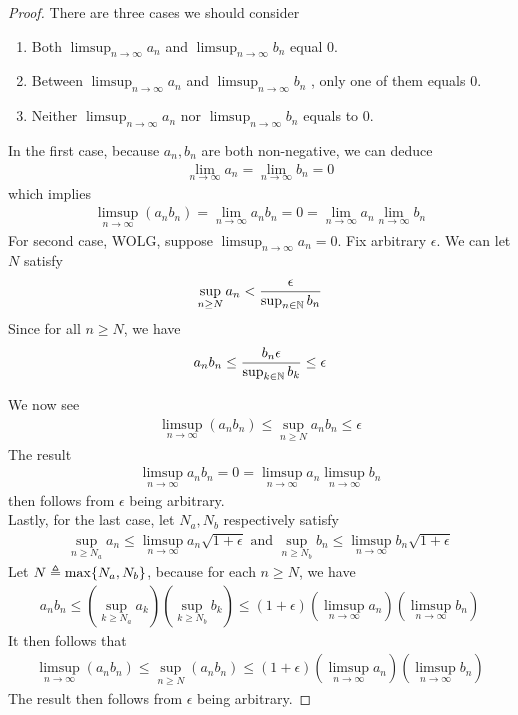 \documentclass{report}
\begin{document}
\begin{proof}
There are three cases we should consider 
\begin{enumerate}[label=(\alph*)]
  \item Both  $\limsup_{n\to\infty} a_n$ and $\limsup_{n\to\infty} b_n$ equal $0$. 
  \item Between $\limsup_{n\to\infty} a_n$ and $\limsup_{n\to\infty} b_n$ , only one of them equals $0$.  
  \item Neither  $\limsup_{n\to\infty} a_n$ nor $\limsup_{n\to\infty} b_n$ equals to $0$. 
\end{enumerate}
In the first case, because $a_n,b_n$ are both non-negative, we can deduce 
\begin{align*}
\lim_{n\to \infty}a_n=\lim_{n\to \infty}b_n=0
\end{align*}
which implies 
\begin{align*}
\limsup_{n\to\infty} (a_nb_n)=\lim_{n\to \infty}a_nb_n=0=\lim_{n\to \infty}a_n \lim_{n\to \infty}b_n
\end{align*}
For second case, WOLG, suppose $\limsup_{n\to\infty} a_n=0$. Fix arbitrary $\epsilon $. We can let $N$ satisfy 
 \begin{align*}
\sup_{n\geq N} a_n < \frac{\epsilon }{\sup_{n\in\mathbb{N}}b_n}
\end{align*}
Since for all $n \geq N$, we have 
\begin{align*}
a_nb_n \leq \frac{b_n\epsilon }{\sup_{k\in\mathbb{N}}b_k}\leq \epsilon 
\end{align*}

We now see 
\begin{align*}
\limsup_{n\to\infty} (a_nb_n)\leq \sup_{n\geq N}a_nb_n \leq \epsilon 
\end{align*}
The result 
\begin{align*}
\limsup_{n\to\infty} a_nb_n=0=\limsup_{n\to\infty} a_n \limsup_{n\to\infty} b_n
\end{align*}
then follows from $\epsilon $ being arbitrary. \\

Lastly, for the last case, let $N_a,N_b$ respectively satisfy 
 \begin{align*}
\sup_{n\geq N_a} a_n\leq \limsup_{n\to\infty} a_n \sqrt{1+\epsilon } \text{ and }\sup_{n \geq  N_b}b_n\leq \limsup_{n\to\infty} b_n \sqrt{1+\epsilon }  
\end{align*}
Let $N\triangleq \max \{ N_a,N_b \}$, because for each  $n\geq N$, we have 
\begin{align*}
a_nb_n\leq (\sup_{k\geq N_a} a_k)(\sup_{k\geq N_b}b_k) \leq (1+\epsilon  )(\limsup_{n\to\infty} a_n)(\limsup_{n\to\infty} b_n)
\end{align*}
It then follows that 
\begin{align*}
\limsup_{n\to\infty} (a_nb_n)\leq \sup_{n\geq N}(a_nb_n)\leq (1+\epsilon )(\limsup_{n\to\infty} a_n)(\limsup_{n\to\infty}  b_n)
\end{align*}
The result then follows from $\epsilon $ being arbitrary.
\end{proof}
\end{document}
